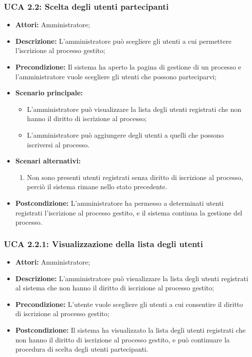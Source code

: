 \subsubsection{UCA 2.2: Scelta degli utenti partecipanti}
\begin{itemize}
\item \textbf{Attori:}
 Amministratore;
\item \textbf{Descrizione:} 
L'amministratore può scegliere gli utenti a cui permettere l'iscrizione al processo gestito;
\item \textbf{Precondizione:} 
Il sistema ha aperto la pagina di gestione di un processo e l'amministratore vuole scegliere gli utenti che possono parteciparvi;
\item \textbf{Scenario principale:} 
\begin{itemize}
\item L'amministratore può visualizzare la lista degli utenti registrati che non hanno il diritto di iscrizione al processo;
\item L'amministratore può aggiungere degli utenti a quelli che possono iscriversi al processo.
\end{itemize}
\item \textbf{Scenari alternativi:}
\begin{enumerate}
\item Non sono presenti utenti registrati senza diritto di iscrizione al processo, perciò il sistema rimane nello stato precedente.
\end{enumerate}
\item \textbf{Postcondizione:} 
L'amministratore ha permesso a determinati utenti registrati l'iscrizione al processo gestito, e il sistema continua la gestione del processo.
\end{itemize}

\hypertarget{A2.2.1}{}
\subsubsection{UCA 2.2.1: Visualizzazione della lista degli utenti}
\begin{itemize}
\item \textbf{Attori:}
 Amministratore;
\item \textbf{Descrizione:} 
L'amministratore può visualizzare la lista degli utenti registrati al sistema che non hanno il diritto di iscrizione al processo gestito; 
\item \textbf{Precondizione:} 
L'utente vuole scegliere gli utenti a cui consentire il diritto di iscrizione al processo gestito; 
\item \textbf{Postcondizione:} 
Il sistema ha visualizzato la lista degli utenti registrati che non hanno il diritto di iscrizione al processo gestito, e può continuare la procedura di scelta degli utenti partecipanti.
\end{itemize}

